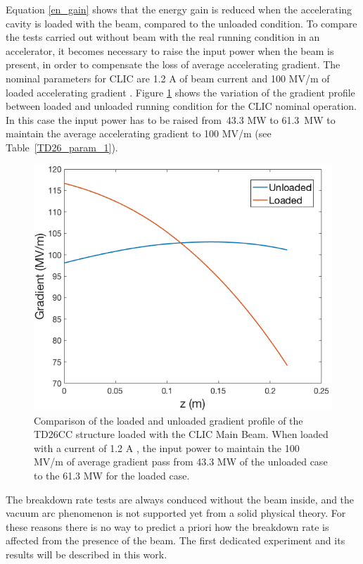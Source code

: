 Equation \ref{en_gain} shows that the energy gain is reduced when the accelerating cavity is loaded with the beam, compared to the unloaded condition. To compare the tests carried out without beam with the real running condition in an accelerator, it becomes necessary to raise the input power when the beam is present, in order to compensate the loss of average accelerating gradient. The nominal parameters for CLIC are 1.2 A of beam current and 100 MV/m of loaded accelerating gradient \cite{CLIC:cdr}. Figure \ref{100mvm} shows the variation of the gradient profile between loaded and unloaded running condition for the CLIC nominal operation. In this case the input power has to be raised from~43.3 MW to 61.3~MW to maintain the average accelerating gradient to 100 MV/m (see Table~\ref{TD26_param_1}).

\begin{figure}[h]
\centering 
\includegraphics[scale=0.45]{pictures/grad_vs_IP.png}
\caption{Comparison of the loaded and unloaded gradient profile of the TD26CC structure loaded with the CLIC Main Beam. When loaded with a current of 1.2 A , the input power to maintain the 100 MV/m of average gradient pass from 43.3 MW of the unloaded case to the 61.3 MW for the loaded case. }
\label{100mvm}
\end{figure}

The breakdown rate tests are always conduced without the beam inside, and the vacuum arc phenomenon is not supported yet from a solid physical theory. For these reasons there is no way to predict a priori how the breakdown rate is affected from the presence of the beam. The first dedicated experiment and its results will be described in this work.

